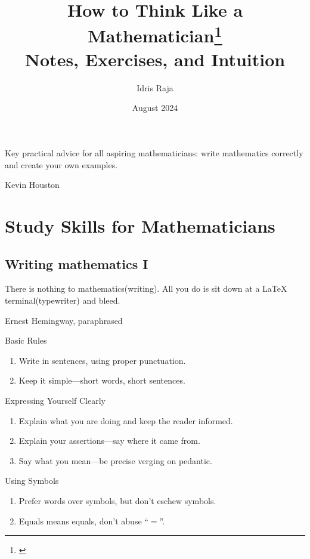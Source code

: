 \documentclass[12pt]{book}
\title{How to Think Like a Mathematician\footnote{\cite{houston2009}}\\Notes, Exercises, and Intuition}
\author{Idris Raja}
\date{August 2024}
\begin{document}
\maketitle{}
\epigraph{
	Key practical advice for all aspiring mathematicians:
	write mathematics correctly and create your own examples.
}{Kevin Houston}
\tableofcontents
{}
% 
% 
\setcounter{chapter}{2}

\part{Study Skills for Mathematicians}
\chapter{Writing mathematics I}
\epigraph{There is nothing to mathematics\;(writing). All you do is sit down at
	a \LaTeX{} terminal\;(typewriter) and bleed.}
{Ernest Hemingway, paraphrased}


\begin{definition}{Basic Rules}{}
	\begin{enumerate}[label = {(\arabic*)}]
		\item Write in sentences, using proper punctuation.
		\item Keep it simple---short words, short sentences.
	\end{enumerate}
\end{definition}

\begin{definition}{Expressing Yourself Clearly}{}
	\begin{enumerate}[label = {(\arabic*)}]
		\item Explain what you are doing and keep the reader informed.
		\item Explain your assertions---say where it came from.
		\item Say what you mean---be precise verging on pedantic.
	\end{enumerate}
\end{definition}

\begin{definition}{Using Symbols}{}
	\begin{enumerate}[label = {(\arabic*)}]
		\item Prefer words over symbols, but don't eschew symbols.
		\item Equals means equals, don't abuse ``$=$''.
	\end{enumerate}
\end{definition}
\end{document}
